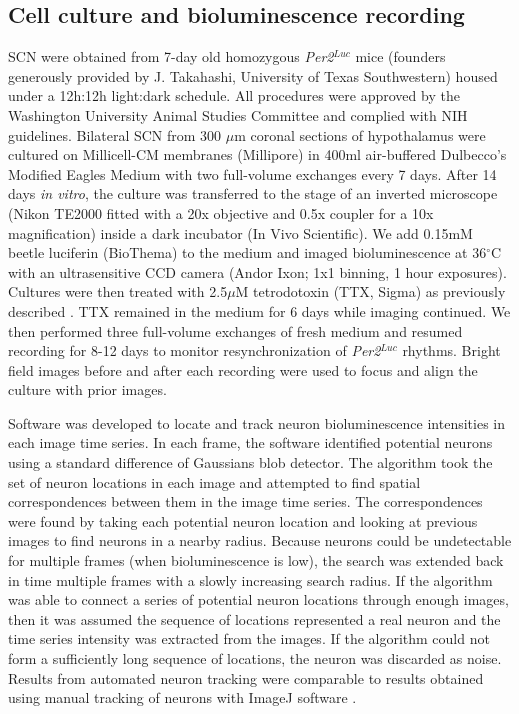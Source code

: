 \subsection*{Cell culture and bioluminescence recording}
SCN were obtained from 7-day old homozygous \textit{Per2$^{Luc}$} mice (founders generously provided by J. Takahashi, University of Texas Southwestern) housed under a 12h:12h light:dark schedule. 
All procedures were approved by the Washington University Animal Studies Committee and complied with NIH guidelines.
Bilateral SCN from 300 $\mu$m coronal sections of hypothalamus were cultured on Millicell-CM membranes (Millipore) in 400ml air-buffered Dulbecco's Modified Eagles Medium with two full-volume exchanges every 7 days.
After 14 days \textit{in vitro}, the culture was transferred to the stage of an inverted microscope (Nikon TE2000 fitted with a 20x objective and 0.5x coupler for a 10x magnification) inside a dark incubator (In Vivo Scientific).
We add 0.15mM beetle luciferin (BioThema) to the medium and imaged bioluminescence at 36$^\circ$C with an ultrasensitive CCD camera (Andor Ixon; 1x1 binning, 1 hour exposures).
Cultures were then treated with 2.5$\mu$M tetrodotoxin (TTX, Sigma) as previously described \cite{Webb2009}.
TTX remained in the medium for 6 days while imaging continued. We then performed three full-volume exchanges of fresh medium and resumed recording for 8-12 days to monitor resynchronization of \textit{Per2$^{Luc}$} rhythms.
Bright field images before and after each recording were used to focus and align the culture with prior images.

Software was developed to locate and track neuron bioluminescence intensities in each image time series.
In each frame, the software identified potential neurons using a standard difference of Gaussians blob detector.
The algorithm took the set of neuron locations in each image and attempted to find spatial correspondences between them in the image time series.
The correspondences were found by taking each potential neuron location and looking at previous images to find neurons in a nearby radius.
Because neurons could be undetectable for multiple frames (when bioluminescence is low), the search was extended back in time multiple frames with a slowly increasing search radius.
If the algorithm was able to connect a series of potential neuron locations through enough images, then it was assumed the sequence of locations represented a real neuron and the time series intensity was extracted from the images.
If the algorithm could not form a sufficiently long sequence of locations, the neuron was discarded as noise.
Results from automated neuron tracking were comparable to results obtained using manual tracking of neurons with ImageJ software \cite{Schneider2012}.


